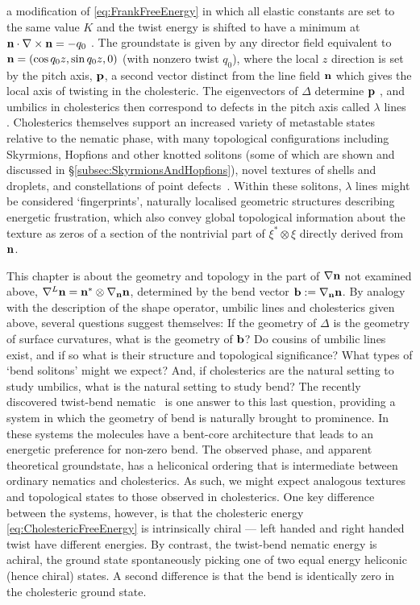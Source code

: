 a modification of \eqref{eq:FrankFreeEnergy} in which all elastic constants are set to the same value $K$ and the twist energy is shifted to have a minimum at $\mathbf{n} \cdot \nabla \times \mathbf{n} = -q_0$ \citep{deGennes1992}. The groundstate is given by any director field equivalent to $\mathbf{n} = (\cos q_0 z, \sin q_0 z, 0)$ (with nonzero twist $q_0$), where the local $z$ direction is set by the pitch axis, $\mathbf{p}$, a second vector distinct from the line field $\mathbf{n}$ which gives the local axis of twisting in the cholesteric. The eigenvectors of $\Delta$ determine $\mathbf{p}$ \citep{Bellar2014, Machon2016b}, and umbilics in cholesterics then correspond to defects in the pitch axis called $\lambda$ lines \citep{deGennes1992, Bellar2014}. Cholesterics themselves support an increased variety of metastable states relative to the nematic phase, with many topological configurations including Skyrmions, Hopfions and other knotted solitons (some of which are shown and discussed in \S \ref{subsec:SkyrmionsAndHopfions}), novel textures of shells and droplets, and constellations of point defects~\citep{posnjak17}. Within these solitons, $\lambda$ lines might be considered `fingerprints', naturally localised geometric structures describing energetic frustration, which also convey global topological information about the texture as zeros of a section of the nontrivial part of $\xi^* \otimes \xi$ directly derived from $\mathbf{n}$. 

This chapter is about the geometry and topology in the part of $\nabla \mathbf{n}$ not examined above, $\nabla^L \mathbf{n}= \mathbf{n}^* \otimes \nabla_{\mathbf{n}} \mathbf{n}$, determined by the bend vector $\mathbf{b}:= \nabla_{\mathbf{n}} \mathbf{n}$. By analogy with the description of the shape operator, umbilic lines and cholesterics given above, several questions suggest themselves: If the geometry of $\Delta$ is the geometry of surface curvatures, what is the geometry of $\mathbf{b}$? Do cousins of umbilic lines exist, and if so what is their structure and topological significance? What types of `bend solitons' might we expect? And, if cholesterics are the natural setting to study umbilics, what is the natural setting to study bend? The recently discovered twist-bend nematic~\citep{Cestari2011, Chen2013, Borshch2013, Lavrentovich2018} is one answer to this last question, providing a system in which the geometry of bend is naturally brought to prominence. In these systems the molecules have a bent-core architecture that leads to an energetic preference for non-zero bend. The observed phase, and apparent theoretical groundstate, has a heliconical ordering that is intermediate between ordinary nematics and cholesterics. As such, we might expect analogous textures and topological states to those observed in cholesterics. One key difference between the systems, however, is that the cholesteric energy \eqref{eq:CholestericFreeEnergy} is intrinsically chiral --- left handed and right handed twist have different energies. By contrast, the twist-bend nematic energy is achiral, the ground state spontaneously picking one of two equal energy heliconic (hence chiral) states. A second difference is that the bend is identically zero in the cholesteric ground state.

